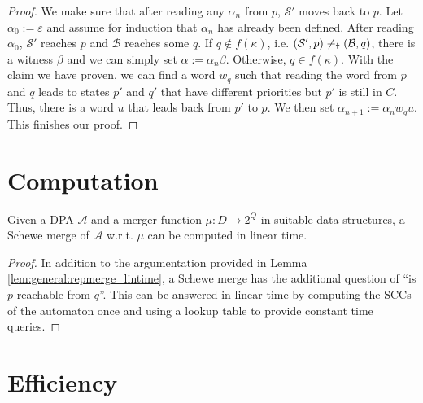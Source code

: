 \begin{proof}
	We make sure that after reading any $\alpha_n$ from $p$, $\mathcal{S}'$ moves back to $p$. Let $\alpha_0 := \varepsilon$ and assume for induction that $\alpha_n$ has already been defined. After reading $\alpha_0$, $\mathcal{S}'$ reaches $p$ and $\mathcal{B}$ reaches some $q$. If $q \notin f(\kappa)$, i.e. $(\mathcal{S}', p) \not\equiv_\text{\Ankh} (\mathcal{B}, q)$, there is a witness $\beta$ and we can simply set $\alpha := \alpha_n \beta$. Otherwise, $q \in f(\kappa)$. With the claim we have proven, we can find a word $w_q$ such that reading the word from $p$ and $q$ leads to states $p'$ and $q'$ that have different priorities but $p'$ is still in $C$. Thus, there is a word $u$ that leads back from $p'$ to $p$. We then set $\alpha_{n+1} := \alpha_n w_q u$. This finishes our proof.
\end{proof}



\section{Computation}
\begin{lem}
	Given a DPA $\mathcal{A}$ and a merger function $\mu : D \rightarrow 2^Q$ in suitable data structures, a Schewe merge of $\mathcal{A}$ w.r.t. $\mu$ can be computed in linear time.
\end{lem}

\begin{proof}
	In addition to the argumentation provided in Lemma \ref{lem:general:repmerge_lintime}, a Schewe merge has the additional question of \enquote{is $p$ reachable from $q$}. This can be answered in linear time by computing the SCCs of the automaton once and using a lookup table to provide constant time queries.
\end{proof}



\section{Efficiency}




